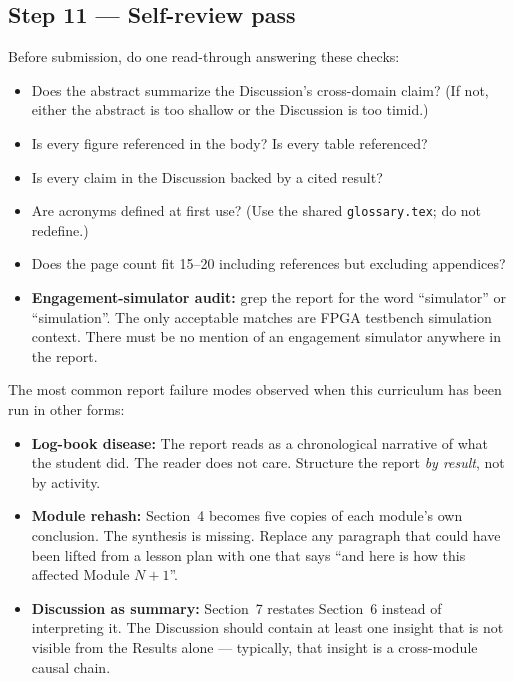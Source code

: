 \documentclass[11pt,letterpaper]{article}
\begin{document}
\subsection{Step 11 --- Self-review pass}
Before submission, do one read-through answering these checks:
\begin{itemize}[leftmargin=2em]
	\item Does the abstract summarize the Discussion's cross-domain claim? (If not, either the abstract is too shallow or the Discussion is too timid.)
	\item Is every figure referenced in the body? Is every table referenced?
	\item Is every claim in the Discussion backed by a cited result?
	\item Are acronyms defined at first use? (Use the shared \texttt{glossary.tex}; do not redefine.)
	\item Does the page count fit 15--20 including references but excluding appendices?
	\item \textbf{Engagement-simulator audit:} grep the report for the word ``simulator'' or ``simulation''. The only acceptable matches are FPGA testbench simulation context. There must be no mention of an engagement simulator anywhere in the report.
\end{itemize}

\begin{tcolorbox}[warning={Common Report Failure Modes}]
	The most common report failure modes observed when this curriculum has been run in other forms:
	\begin{itemize}[leftmargin=1.2em]
		\item \textbf{Log-book disease:} The report reads as a chronological narrative of what the student did. The reader does not care. Structure the report \emph{by result}, not by activity.
		\item \textbf{Module rehash:} Section~4 becomes five copies of each module's own conclusion. The synthesis is missing. Replace any paragraph that could have been lifted from a lesson plan with one that says ``and here is how this affected Module $N+1$''.
		\item \textbf{Discussion as summary:} Section~7 restates Section~6 instead of interpreting it. The Discussion should contain at least one insight that is not visible from the Results alone --- typically, that insight is a cross-module causal chain.
	\end{itemize}
\end{tcolorbox}
\end{document}
